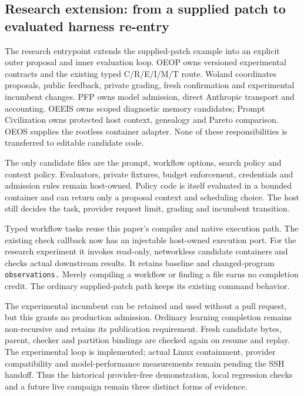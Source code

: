 \documentclass[
  11pt,
]{article}
\begin{document}
\subsection{Research extension: from a supplied patch to evaluated
harness
re-entry}\label{research-extension-from-a-supplied-patch-to-evaluated-harness-re-entry}

The research entrypoint extends the supplied-patch example into an
explicit outer proposal and inner evaluation loop. OEOP owns versioned
experimental contracts and the existing typed C/R/E/I/M/T route. Woland
coordinates proposals, public feedback, private grading, fresh
confirmation and experimental incumbent changes. PFP owns model
admission, direct Anthropic transport and accounting. OEEIS owns scoped
diagnostic memory candidates; Prompt Civilization owns protected host
context, genealogy and Pareto comparison. OEOS supplies the rootless
container adapter. None of these responsibilities is transferred to
editable candidate code.

The only candidate files are the prompt, workflow options, search policy
and context policy. Evaluators, private fixtures, budget enforcement,
credentials and admission rules remain host-owned. Policy code is itself
evaluated in a bounded container and can return only a proposal context
and scheduling choice. The host still decides the task, provider request
limit, grading and incumbent transition.

Typed workflow tasks reuse this paper's compiler and native execution
path. The existing check callback now has an injectable host-owned
execution port. For the research experiment it invokes read-only,
networkless candidate containers and checks actual downstream results.
It retains baseline and changed-program \nolinkurl{observations.} Merely
compiling a workflow or finding a file earns no completion credit. The
ordinary supplied-patch path keeps its existing command behavior.

The experimental incumbent can be retained and used without a pull
request, but this grants no production admission. Ordinary learning
completion remains non-recursive and retains its publication
requirement. Fresh candidate bytes, parent, checker and partition
bindings are checked again on resume and replay. The experimental loop
is implemented; actual Linux containment, provider compatibility and
model-performance measurements remain pending the SSH handoff. Thus the
historical provider-free demonstration, local regression checks and a
future live campaign remain three distinct forms of evidence.
\end{document}

